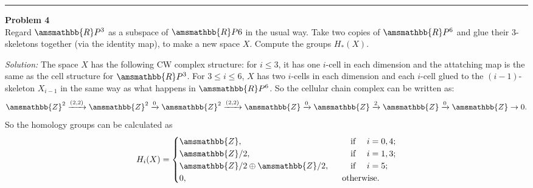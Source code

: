 \documentclass[a4paper, 12pt]{article}
\newenvironment{problem}[2][Problem]
    { \begin{mdframed}[backgroundcolor=gray!20] \textbf{#1 #2} \\}
    {  \end{mdframed}}
\newenvironment{solution}
    {\textit{Solution:}}
    {}
\renewcommand{\mathbb}{\amsmathbb}
\newcommand{\iif}{\ \ \ \text{if}\ \ \ }
\newcommand{\otherwise}{\text{otherwise}}
\begin{document}
\noindent\rule{7in}{2.8pt}
\begin{problem}{4}
Regard \(\mathbb{R}P^3\) as a subspace of \(\mathbb{R}P6\) in the usual way. Take two copies of \(\mathbb{R}P^6\) and glue their 3-skeletons together (via the identity map), to make 
a new space \(X\). Compute the groups \(H_*(X)\).
\end{problem}
\begin{solution}
The space \(X\) has the following CW complex structure: for \(i\leq 3\), it has one \(i\)-cell in each dimension and the attatching map is the same as the cell structure for \(\mathbb{R}P^3\). For \(3\leq i\leq 6\), \(X\) has two \(i\)-cells 
in each dimension and each \(i\)-cell glued to the \((i-1)\)-skeleton \(X_{i-1}\) in the same way as what happens in \(\mathbb{R}P^6\). So the cellular chain complex can be written as: 
\[\mathbb{Z}^2\xrightarrow{(2,2)}\mathbb{Z}^2\xrightarrow{0}\mathbb{Z}^2\xrightarrow{(2,2)}\mathbb{Z}\xrightarrow{0}\mathbb{Z}\xrightarrow{2}\mathbb{Z}\xrightarrow{0} \mathbb{Z}\rightarrow 0.\]
So the homology groups can be calculated as 
\[H_i(X)=\begin{cases}
	\mathbb{Z},&\ \ \iif\ i=0,4;\\ 
	\mathbb{Z}/2,&\ \ \iif \ i=1,3;\\ 
	\mathbb{Z}/2\oplus \mathbb{Z}/2,&\ \ \iif\ i=5;\\ 
	0,&\ \ \otherwise.
\end{cases}\]
\end{solution}
\end{document}
